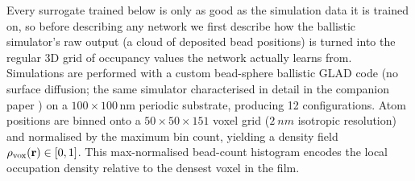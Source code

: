 \documentclass[aip,amsmath,amssymb,reprint]{revtex4-1}
\begin{document}
Every surrogate trained below is only as good as the simulation
data it is trained on, so before describing any network we first
describe how the ballistic simulator's raw output (a cloud of
deposited bead positions) is turned into the regular 3D grid of
occupancy values the network actually learns from.
Simulations are performed with a custom bead-sphere ballistic GLAD code
(no surface diffusion; the same simulator characterised in detail in the
companion paper \citep{companionP1}) on a $100 \times 100\,\mathrm{nm}$
periodic substrate, producing 12 configurations.
Atom positions are binned onto a
$50 \times 50 \times 151$ voxel grid ($\SI{2}{nm}$ isotropic
resolution) and normalised by the maximum bin count,
yielding a density field $\rho_{\rm vox}(\mathbf{r}) \in [0,1]$.
This max-normalised bead-count histogram encodes the local
occupation density relative to the densest voxel in the film.
\end{document}
